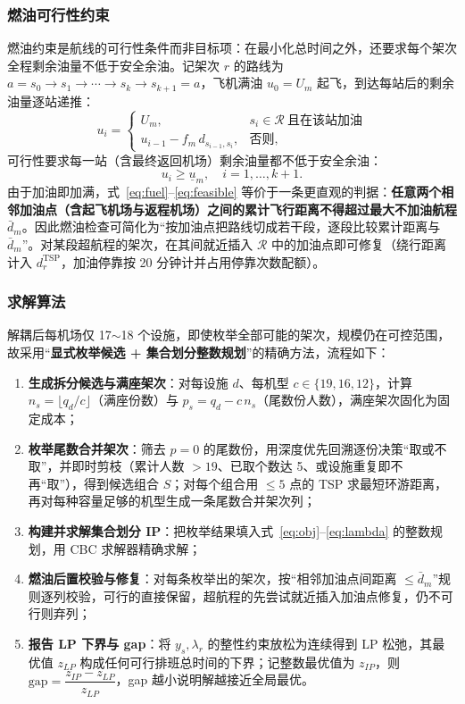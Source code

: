 \documentclass[UTF8,zihao=-4]{ctexart}
\numberwithin{figure}{section}
\numberwithin{table}{section}
\begin{document}
\subsubsection{燃油可行性约束}

燃油约束是航线的可行性条件而非目标项：在最小化总时间之外，还要求每个架次全程剩余油量不低于安全余油。记架次 $r$ 的路线为 $a=s_0\to s_1\to\cdots\to s_k\to s_{k+1}=a$，飞机满油 $u_0=U_m$ 起飞，到达每站后的剩余油量逐站递推：
\begin{equation}
  u_i=\begin{cases}
    U_m, & s_i\in\mathcal{R}\ \text{且在该站加油}\\
    u_{i-1}-f_m\,d_{s_{i-1},s_i}, & \text{否则},
  \end{cases}\label{eq:fuel}
\end{equation}
可行性要求每一站（含最终返回机场）剩余油量都不低于安全余油：
\begin{equation}
  u_i\ge \underline{u}_m,\quad i=1,\dots,k+1.\label{eq:feasible}
\end{equation}
由于加油即加满，式~\eqref{eq:fuel}--\eqref{eq:feasible} 等价于一条更直观的判据：\textbf{任意两个相邻加油点（含起飞机场与返程机场）之间的累计飞行距离不得超过最大不加油航程 $\bar{d}_m$}。因此燃油检查可简化为“按加油点把路线切成若干段，逐段比较累计距离与 $\bar{d}_m$”。对某段超航程的架次，在其间就近插入 $\mathcal{R}$ 中的加油点即可修复（绕行距离计入 $d_r^{\mathrm{TSP}}$，加油停靠按 20 分钟计并占用停靠次数配额）。

\subsubsection{求解算法}

解耦后每机场仅 17$\sim$18 个设施，即使枚举全部可能的架次，规模仍在可控范围，故采用“\textbf{显式枚举候选 + 集合划分整数规划}”的精确方法，流程如下：

\begin{enumerate}
  \item \textbf{生成拆分候选与满座架次}：对每设施 $d$、每机型 $c\in\{19,16,12\}$，计算 $n_s=\lfloor q_d/c\rfloor$（满座份数）与 $p_s=q_d-c\,n_s$（尾数份人数），满座架次固化为固定成本；
  \item \textbf{枚举尾数合并架次}：筛去 $p=0$ 的尾数份，用深度优先回溯逐份决策“取或不取”，并即时剪枝（累计人数 $>19$、已取个数达 5、或设施重复即不再“取”），得到候选组合 $S$；对每个组合用 $\le 5$ 点的 TSP 求最短环游距离，再对每种容量足够的机型生成一条尾数合并架次列；
  \item \textbf{构建并求解集合划分 IP}：把枚举结果填入式~\eqref{eq:obj}--\eqref{eq:lambda} 的整数规划，用 CBC 求解器精确求解；
  \item \textbf{燃油后置校验与修复}：对每条枚举出的架次，按“相邻加油点间距离 $\le\bar{d}_m$”规则逐列校验，可行的直接保留，超航程的先尝试就近插入加油点修复，仍不可行则弃列；
  \item \textbf{报告 LP 下界与 gap}：将 $y_s,\lambda_r$ 的整性约束放松为连续得到 LP 松弛，其最优值 $z_{LP}$ 构成任何可行排班总时间的下界；记整数最优值为 $z_{IP}$，则 $\text{gap}=\dfrac{z_{IP}-z_{LP}}{z_{LP}}$，gap 越小说明解越接近全局最优。
\end{enumerate}
\end{document}
